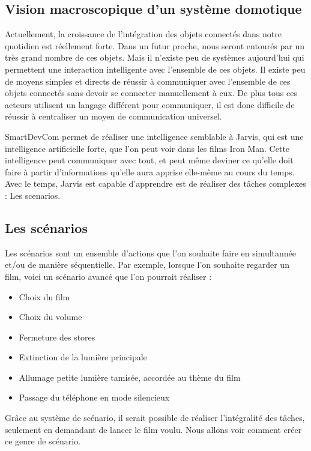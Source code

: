 	\subsection{Vision macroscopique d’un système domotique}
Actuellement, la croissance de l'intégration des objets connectés dans notre quotidien est réellement forte. 
Dans un futur proche, nous seront entourés par un très grand nombre de ces objets. Mais il n'existe peu de 
systèmes aujourd'hui qui permettent une interaction intelligente avec l'ensemble de ces objets. Il existe peu 
de moyens simples et directs de réussir à communiquer avec l'ensemble de ces objets connectés sans devoir se 
connecter manuellement à eux. De plus tous ces acteurs utilisent un langage différent pour communiquer, il 
est donc difficile de réussir à centraliser un moyen de communication universel.

SmartDevCom permet de réaliser une intelligence semblable à Jarvis, qui est une intelligence artificielle 
forte, que l'on peut voir dans les films Iron Man. Cette intelligence peut communiquer avec tout, et peut 
même deviner ce qu'elle doit faire à partir d'informations qu'elle aura apprise elle-même au cours du temps. 
Avec le temps, Jarvis est capable d'apprendre est de réaliser des tâches complexes : Les scenarios.
	\subsection{Les scénarios}
Les scénarios sont un ensemble d'actions que l'on souhaite faire en simultannée et/ou de manière 
séquentielle. 
Par exemple, lorsque l'on souhaite regarder un film, voici un scénario avancé que l'on pourrait réaliser :
\begin{itemize}
 \item Choix du film
 \item Choix du volume
 \item Fermeture des stores
 \item Extinction de la lumière principale
 \item Allumage petite lumière tamisée, accordée au thème du film
 \item Passage du téléphone en mode silencieux 
\end{itemize}

Grâce au système de scénario, il serait possible de réaliser l'intégralité des tâches, seulement en demandant 
de lancer le film voulu. Nous allons voir comment créer ce genre de scénario.
